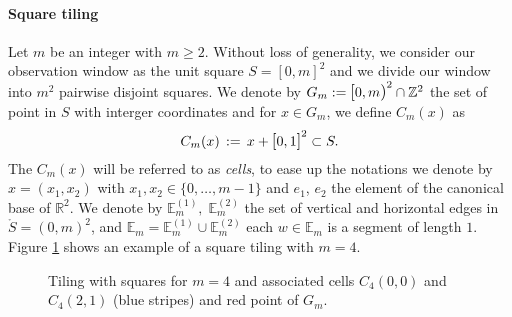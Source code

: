 \documentclass[12pt]{article}
\theoremstyle{Theorem}
\begin{document}
\paragraph{Square tiling}
Let $m$ be an integer with $m \geq 2$. Without loss of generality, we consider our observation window as the unit square $S = [0,m]^{2}$ and  we divide our window into $m^{2}$ pairwise disjoint squares. We denote by $G_{m} := \text{\larger[1]{$[$}}0, m \text{\larger[1]{$)$}}^{2} \cap \mathbb{Z}^{2} $ the set of point in $S$ with interger coordinates and for $x \in G_{m}$, we define $C_{m}(x)$ as
\begin{equation*}
C_{m}(x) \, := \,x + \text{\larger[1]{$[$}}0, 1 \text{\larger[1]{$]$}}^{2} \subset S.
\end{equation*}
The $C_{m}(x)$ will be referred to as \textit{cells}, to ease up the notations we denote by $x = (x_1, x_2)$ with $x_1, x_2 \in \{0,\ldots, m-1\}$ and $e_1$, $e_{2}$ the element of the canonical base of $\mathbb{R}^{2}$.
We denote by $\mathbb{E}^{(1)}_{m}, \; \mathbb{E}^{(2)}_{m} $ the set of vertical and horizontal edges in $\mathring{S} = (0,m)^{2}$, and $\mathbb{E}_{m} = \mathbb{E}^{(1)}_{m} \cup \mathbb{E}^{(2)}_{m}$ each $w \in \mathbb{E}_{m}$ is a segment of length $1$.
Figure \ref{fig1} shows an example of a square tiling with $m = 4$.
\begin{figure}[h]
\begin{center}
\end{center}
\vspace{-0.25cm}
\caption{Tiling with squares for $m = 4$ and associated cells $C_{4}(0,0)$ and $C_{4}(2,1)$ (blue stripes) and red point of $G_{m}$.}
\label{fig1}
\end{figure}
\end{document}
